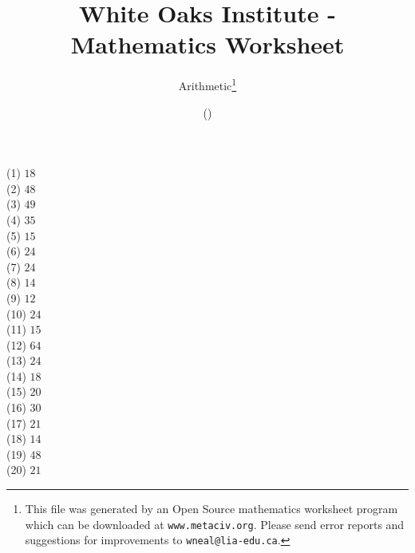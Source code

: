 \documentclass[letter]{article}
\begin{document}
\title{White Oaks Institute - Mathematics Worksheet}
\author{Arithmetic\thanks{This file was generated by an \textsf{Open Source} mathematics worksheet program which can be downloaded at \texttt{www.metaciv.org}. Please send error reports and suggestions for improvements to \texttt{wneal@lia-edu.ca}.}}
\date{\XCfileversion{} (\XCfiledate)}
\maketitle
\setlength{\parskip}{12mm plus 4mm minus 4mm}\setlength{\parindent}{0cm}\begin{multicols}{2}(1) $18$\\(2) $48$\\(3) $49$\\(4) $35$\\(5) $15$\\(6) $24$\\(7) $24$\\(8) $14$\\(9) $12$\\(10) $24$\\(11) $15$\\(12) $64$\\(13) $24$\\(14) $18$\\(15) $20$\\(16) $30$\\(17) $21$\\(18) $14$\\(19) $48$\\(20) $21$\\\end{multicols}
\end{document}
